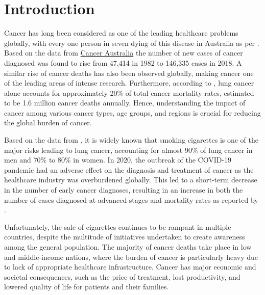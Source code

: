 \documentclass[11pt,a4paper,]{article}
\begin{document}
\hypertarget{introduction}{%
\section{Introduction}\label{introduction}}

Cancer has long been considered as one of the leading healthcare problems globally, with every one person in seven dying of this disease in Australia as per \textcite{canceraussie}. Based on the data from \href{https://www.canceraustralia.gov.au/impacted-cancer/what-cancer/cancer-australia-statistics}{Cancer Australia} the number of new cases of cancer diagnosed was found to rise from 47,414 in 1982 to 146,335 cases in 2018. A similar rise of cancer deaths has also been observed globally, making cancer one of the leading areas of intense research. Furthermore, according to \textcite{AGGARWAL20161040}, lung cancer alone accounts for approximately 20\% of total cancer mortality rates, estimated to be 1.6 million cancer deaths annually. Hence, understanding the impact of cancer among various cancer types, age groups, and regions is crucial for reducing the global burden of cancer.

Based on the data from \textcite{doi:10.1513/pats.200809-100TH}, it is widely known that smoking cigarettes is one of the major risks leading to lung cancer, accounting for almost 90\% of lung cancer in men and 70\% to 80\% in women. In 2020, the outbreak of the COVID-19 pandemic had an adverse effect on the diagnosis and treatment of cancer as the healthcare industry was overburdened globally. This led to a short-term decrease in the number of early cancer diagnoses, resulting in an increase in both the number of cases diagnosed at advanced stages and mortality rates as reported by \textcite{yabroff2022association}.

Unfortunately, the sale of cigarettes continues to be rampant in multiple countries, despite the multitude of initiatives undertaken to create awareness among the general population. The majority of cancer deaths take place in low and middle-income nations, where the burden of cancer is particularly heavy due to lack of appropriate healthcare infrastructure. Cancer has major economic and societal consequences, such as the price of treatment, lost productivity, and lowered quality of life for patients and their families.
\end{document}
